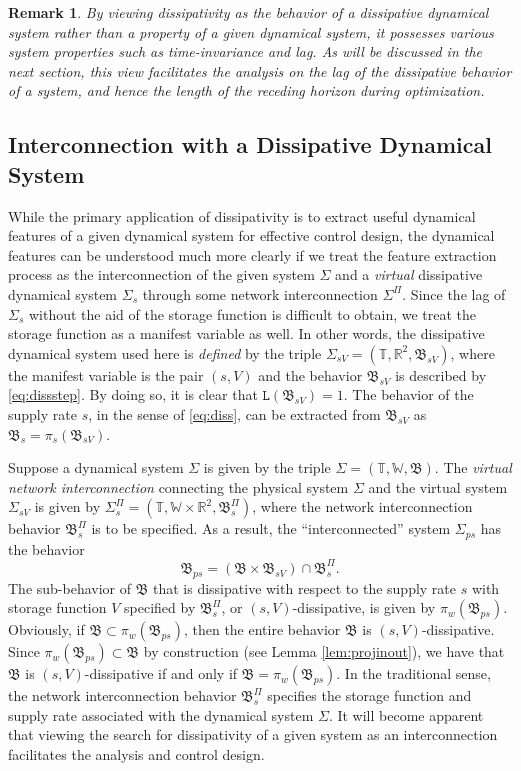 \documentclass[11pt,print,draftcls,onecolumn,romanappendices]{ieeecolor}
\newtheorem{rem}{Remark}
\newcommand{\W}{\mathbb{W}}
\newcommand{\T}{\mathbb{T}}
\newcommand{\R}{\mathbb{R}}
\newcommand{\lag}[1]{\mathtt{L}\left(#1\right)}
\newcommand{\proj}[2]{\pi_{#1}\left(#2\right)}
\newcommand{\B}{\mathfrak{B}}
\begin{document}
\begin{rem}\label{rem:dissipativebehaviour}
	By viewing dissipativity as the behavior of a dissipative dynamical system rather than a property of a given dynamical system, it possesses various system properties such as time-invariance and lag. As will be discussed in the next section, this view facilitates the analysis on the lag of the dissipative behavior of a system, and hence the length of the receding horizon during optimization.
\end{rem}
\subsection{Interconnection with a Dissipative Dynamical System}\label{sec:dissintercon}
While the primary application of dissipativity is to extract useful dynamical features of a given dynamical system for effective control design, the dynamical features can be understood much more clearly if we treat the feature extraction process as the interconnection of the given system $\Sigma$ and a \emph{virtual} dissipative dynamical system $\Sigma_s$ through some network interconnection $\Sigma^\Pi$. Since the lag of $\Sigma_s$ without the aid of the storage function is difficult to obtain, we treat the storage function as a manifest variable as well. In other words, the dissipative dynamical system used here is \emph{defined} by the triple $\Sigma_{sV}=(\T,\R^2,\B_{sV})$, where the manifest variable is the pair $(s,V)$ and the behavior $\B_{sV}$ is described by \eqref{eq:dissstep}. By doing so, it is clear that $\lag{\B_{sV}}=1$. The behavior of the supply rate $s$, in the sense of \eqref{eq:diss}, can be extracted from $\B_{sV}$ as $\B_s=\proj{s}{\B_{sV}}$. 

Suppose a dynamical system $\Sigma$ is given by the triple $\Sigma=(\T,\W,\B)$. The \emph{virtual network interconnection} connecting the physical system $\Sigma$ and the virtual system $\Sigma_{sV}$ is given by $\Sigma_s^\Pi=(\T,\W\times\R^2,\B_{s}^\Pi)$, where the network interconnection behavior $\B_{s}^\Pi$ is to be specified. As a result, the ``interconnected'' system $\Sigma_{ps}$ has the behavior
\begin{equation}\label{eq:invariant+diss}
	\B_{ps}=(\B\times\B_{sV})\cap\B_{s}^\Pi.
\end{equation}
The sub-behavior of $\B$ that is dissipative with respect to the supply rate $s$ with storage function $V$ specified by $\B_{s}^\Pi$, or $(s,V)$-dissipative, is given by $\proj{w}{\B_{ps}}$. Obviously, if $\B\subset\proj{w}{\B_{ps}}$, then the entire behavior $\B$ is $(s,V)$-dissipative. Since $\proj{w}{\B_{ps}}\subset\B$ by construction (see Lemma \ref{lem:projinout}), we have that $\B$ is $(s,V)$-dissipative if and only if $\B=\proj{w}{\B_{ps}}$. In the traditional sense, the network interconnection behavior $\B_{s}^\Pi$ specifies the storage function and supply rate associated with the dynamical system $\Sigma$. It will become apparent that viewing the search for dissipativity of a given system as an interconnection facilitates the analysis and control design.
\end{document}

